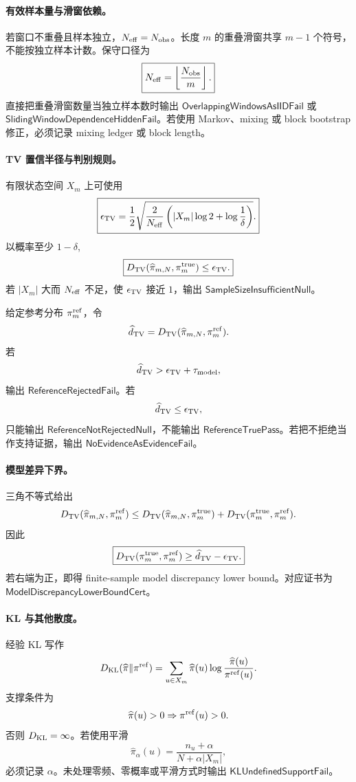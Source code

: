 \paragraph{有效样本量与滑窗依赖。}
若窗口不重叠且样本独立，\(N_{\rm eff}=N_{\rm obs}\)。长度 \(m\) 的重叠滑窗共享 \(m-1\) 个符号，不能按独立样本计数。保守口径为
\[
\boxed{
N_{\rm eff}=\left\lfloor\frac{N_{\rm obs}}{m}\right\rfloor.
}
\]
直接把重叠滑窗数量当独立样本数时输出 \(\mathsf{OverlappingWindowsAsIIDFail}\) 或 \(\mathsf{SlidingWindowDependenceHiddenFail}\)。若使用 Markov、mixing 或 block bootstrap 修正，必须记录 mixing ledger 或 block length。

\paragraph{TV 置信半径与判别规则。}
有限状态空间 \(X_m\) 上可使用
\[
\boxed{
\epsilon_{\rm TV}
=
\frac12
\sqrt{
\frac{2}{N_{\rm eff}}
\left(
|X_m|\log2+\log\frac1\delta
\right)
}.
}
\]
以概率至少 \(1-\delta\),
\[
\boxed{
D_{\rm TV}(\widehat\pi_{m,N},\pi_m^{\rm true})
\le
\epsilon_{\rm TV}.
}
\]
若 \(|X_m|\) 大而 \(N_{\rm eff}\) 不足，使 \(\epsilon_{\rm TV}\) 接近 \(1\)，输出 \(\mathsf{SampleSizeInsufficientNull}\)。

给定参考分布 \(\pi_m^{\rm ref}\)，令
\[
\widehat d_{\rm TV}
=
D_{\rm TV}(\widehat\pi_{m,N},\pi_m^{\rm ref}).
\]
若
\[
\widehat d_{\rm TV}>\epsilon_{\rm TV}+\tau_{\rm model},
\]
输出 \(\mathsf{ReferenceRejectedFail}\)。若
\[
\widehat d_{\rm TV}\le\epsilon_{\rm TV},
\]
只能输出 \(\mathsf{ReferenceNotRejectedNull}\)，不能输出 \(\mathsf{ReferenceTruePass}\)。若把不拒绝当作支持证据，输出 \(\mathsf{NoEvidenceAsEvidenceFail}\)。

\paragraph{模型差异下界。}
三角不等式给出
\[
D_{\rm TV}(\widehat\pi_{m,N},\pi_m^{\rm ref})
\le
D_{\rm TV}(\widehat\pi_{m,N},\pi_m^{\rm true})
+
D_{\rm TV}(\pi_m^{\rm true},\pi_m^{\rm ref}).
\]
因此
\[
\boxed{
D_{\rm TV}(\pi_m^{\rm true},\pi_m^{\rm ref})
\ge
\widehat d_{\rm TV}-\epsilon_{\rm TV}.
}
\]
若右端为正，即得 finite-sample model discrepancy lower bound。对应证书为 \(\mathsf{ModelDiscrepancyLowerBoundCert}\)。

\paragraph{KL 与其他散度。}
经验 KL 写作
\[
D_{\rm KL}(\widehat\pi\|\pi^{\rm ref})
=
\sum_{u\in X_m}
\widehat\pi(u)\log\frac{\widehat\pi(u)}{\pi^{\rm ref}(u)}.
\]
支撑条件为
\[
\widehat\pi(u)>0\Rightarrow \pi^{\rm ref}(u)>0.
\]
否则 \(D_{\rm KL}=\infty\)。若使用平滑
\[
\widehat\pi_\alpha(u)=
\frac{n_u+\alpha}{N+\alpha|X_m|},
\]
必须记录 \(\alpha\)。未处理零频、零概率或平滑方式时输出 \(\mathsf{KLUndefinedSupportFail}\)。

